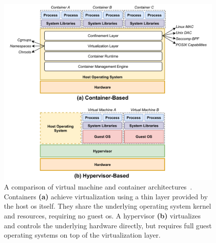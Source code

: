 
\begin{figure}[htbp]
  \centering
  \includegraphics[width=1\linewidth]{figs/background/virtualization.pdf}
  \caption[A comparison of virtual machine and container architectures]{
    A comparison of virtual machine and container
    architectures~\cite{sultan2019_container_security, eder2016_hypervisor_container}.
    Containers \textbf{(a)} achieve virtualization using a thin layer provided by the host
    \gls{os} itself. They share the underlying operating system kernel and resources,
    requiring no guest \gls{os}. A hypervisor \textbf{(b)} virtualizes and controls the
    underlying hardware directly, but requires full guest operating systems on top of the
    virtualization layer.
  }%
  \label{fig:virt}
\end{figure}

